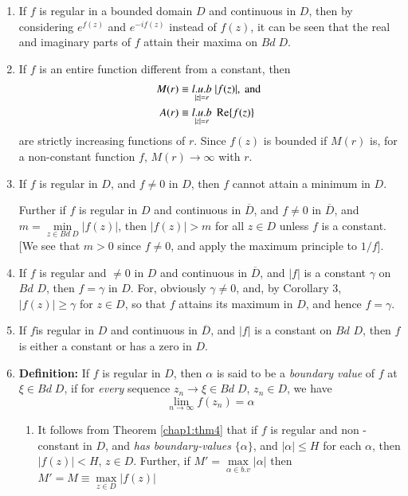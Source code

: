 \begin{corollaries*}    
\begin{enumerate}
\renewcommand{\labelenumi}{(\theenumi)}
\item If $f$ is regular in a bounded domain $D$ and continuous in $D$,
  then by considering $e^{f(z)}$ and $e^{-if(z)}$ instead of $f(z)$,
  it can be seen that the real and imaginary parts of $f$ attain their
  maxima on $Bd \; D$.

\item If $f$ is an entire function different from a constant, then 
\begin{align*}
M(r) & \equiv \underset{|z|=r}{l.u.b} \; |f(z)|, \text{ and }\\
A(r) & \equiv \underset{|z|=r}{l.u.b} \; \operatorname{Re}\{f(z)\}
\end{align*}
are strictly increasing functions of $r$. Since $f(z)$ is bounded if
$M(r)$ is, for a non-constant function $f$, $M(r) \to \infty$ with
$r$. 

\item If $f$ is regular in $D$, and $f\neq 0$ in $D$, then $f$ cannot
  attain a minimum in $D$.

Further if $f$ is regular  in $D$ and continuous in $\overline{D}$, and
$f\neq 0$ in $\overline{D}$, and $m = \min\limits_{z \in Bd \; D} |f(z)|$,
then $|f(z)| >m$ for all $z \in D$ unless $f$ is a constant. [We see
  that  $m>0$ since $f\neq 0$, and apply the maximum principle to $1/f$].

\item If $f$ is regular and $\neq 0$ in $D$ and continuous in
  $\overline{D}$, and $|f|$ is a constant $\gamma$ on $Bd$ $D$, then $f =
  \gamma$ in $D$. For, obviously $\gamma \neq 0$, and, by Corollary
  3, $|f(z)|  \ge \gamma$ for $z \in D$, so that $f$ attains its
  maximum in $D$, and hence $f = \gamma$.

\item If $f$\pageoriginale is regular in $D$ and continuous in
  $\overline{D}$, and $|f|$ is a constant on $Bd$ $D$, then $f$ is either
  a constant or has a zero in $D$.

\item \textbf{Definition:} If $f$ is regular in $D$, then $\alpha$ is
  said to be a {\em boundary value}  of $f$ at $\xi \in Bd \; D$,
  if for {\em every} sequence $z_n \to \xi \in  Bd \; D$, $z_n \in D$,
  we have
$$
\lim\limits_{n \to \infty} f(z_n) = \alpha
$$

\begin{enumerate}
\renewcommand{\theenumii}{\alph{enumii}}
\renewcommand{\labelenumii}{(\theenumii)}
\item It follows from Theorem \ref{chap1:thm4} that if $f$ is regular and
  non - constant in $D$, and {\em has boundary-values} $\{\alpha\}$, and
  $|\alpha| \leq H$ for each $\alpha$, then $|f(z)| < H$, $z\in
  D$. Further, if $M' = \max\limits_{\alpha \in b.v} |\alpha|$ then
  $M'=M \equiv \max\limits_{z\in D} |f(z)|$


\end{enumerate}
\end{enumerate}
\end{corollaries*}
